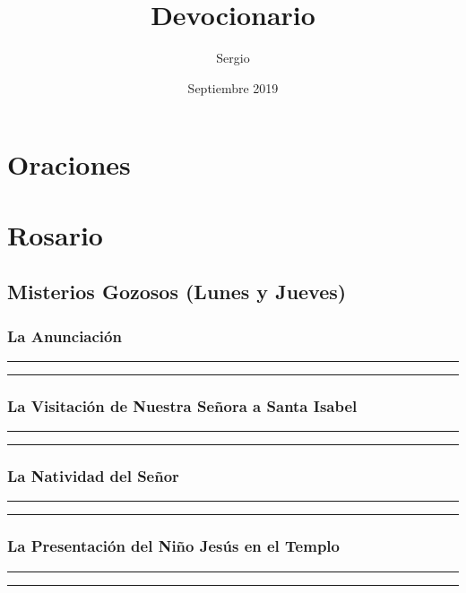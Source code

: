 \documentclass[11pt,a4paper]{report}
\title{Devocionario}
\author{Sergio}
\date{Septiembre 2019}
\begin{document}
    \maketitle

    \section*{Oraciones}
    

    \section*{Rosario}
    \subsection*{Misterios Gozosos (Lunes y Jueves)}

    \subsubsection*{La Anunciación}
    
    
    \rule{\textwidth}{0.5pt}
    
    \rule{\textwidth}{0.5pt}
    

    \subsubsection*{La Visitación de Nuestra Señora a Santa Isabel}
    
    
    \rule{\textwidth}{0.5pt}
    
    \rule{\textwidth}{0.5pt}
    

    \subsubsection*{La Natividad del Señor}
    
    
    \rule{\textwidth}{0.5pt}
    
    \rule{\textwidth}{0.5pt}
    

    \subsubsection*{La Presentación del Niño Jesús en el Templo}
    
    
    \rule{\textwidth}{0.5pt}
    
    \rule{\textwidth}{0.5pt}
    
\end{document}
